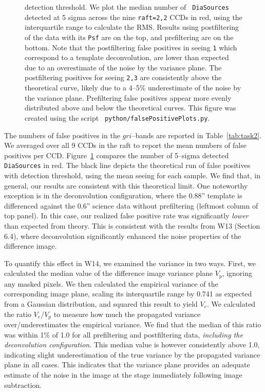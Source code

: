 \documentclass[DM,toc]{lsstdoc}
\begin{document}
\begin{figure}[!h]
{    detection threshold.  We plot the median number of {\tt
      DiaSources} detected at 5 sigma across the nine {\tt raft=2,2}
    CCDs in red, using the interquartile range to calculate the RMS.
    Results using postfiltering of the data with its {\tt Psf} are on
    the top, and prefiltering are on the bottom.  Note that the
    postfiltering false positives in seeing {\tt 1} which correspond
    to a template deconvolution, are lower than expected due to an
    overestimate of the noise by the variance plane.  The
    postfiltering positives for seeing {\tt 2,3} are consistently
    above the theoretical curve, likely due to a 4--5\% underestimate
    of the noise by the variance plane.  Prefiltering false positives
    appear more evenly distributed above and below the theoretical
    curves.  This figure was created using the script {\tt
      python/falsePositivePlots.py}.}
  \label{fig:fptheory}
\end{figure}

The numbers of false positives in the $gri$--bands are reported in
Table~\ref{tab:task2}.  We averaged over all 9 CCDs in the raft to
report the mean numbers of false positives per CCD.
Figure~\ref{fig:fptheory} compares the number of 5--sigma detected
{\tt DiaSources} in red.  The black line depicts the theoretical run
of false positives with detection threshold, using the mean seeing for
each sample.  We find that, in general, our results are consistent
with this theoretical limit.  One noteworthy exception is in the
deconvolution configuration, where the 0.88'' template is differenced
against the 0.6'' science data without prefiltering (leftmost column
of top panel).  In this case, our realized false positive rate was
significantly {\it lower} than expected from theory.  This is
consistent with the results from W13 (Section 6.4), where
deconvolution significantly enhanced the noise properties of the
difference image.

To quantify this effect in W14, we examined the variance in two ways.
First, we calculated the median value of the difference image variance
plane $V_p$, ignoring any masked pixels.  We then calculated the
empirical variance of the corresponding image plane, scaling its
interquartile range by 0.741 as expected from a Gaussian distribution,
and squared this result to yield $V_e$.  We calculated the ratio
$V_e$/$V_p$ to measure how much the propagated variance
over/underestimates the empirical variance.  We find that the median
of this ratio was within 1\% of 1.0 for all prefiltering and
postfiltering data, {\it including the deconvolution configuration}.
This median value is however consistently above 1.0, indicating slight
underestimation of the true variance by the propagated variance plane
in all cases.  This indicates that the variance plane provides an
adequate estimate of the noise in the image at the stage immediately
following image subtraction.
\end{document}
